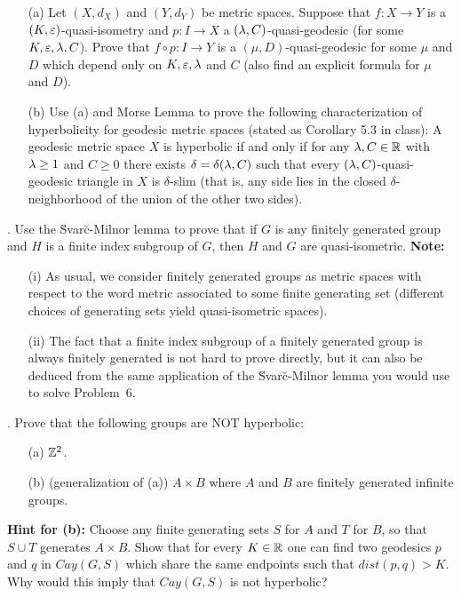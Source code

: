 \documentclass[12pt]{amsart}
\begin{document}
\begin{itemize}
\item[(a)] Let $(X,d_X)$ and $(Y,d_Y)$ be metric spaces. Suppose that $f:X\to Y$ is a $(K,{\varepsilon})$-quasi-isometry and
$p:I\to X$ a $({\lambda},C)$-quasi-geodesic (for some $K,{\varepsilon},{\lambda},C$). Prove that $f\circ p: I\to Y$ is a $(\mu,D)$-quasi-geodesic
for some $\mu$ and $D$ which depend only on $K,{\varepsilon},{\lambda}$ and $C$ (also find an explicit formula for $\mu$ and $D$).
\item[(b)] Use (a) and Morse Lemma to prove the following characterization of hyperbolicity for geodesic metric spaces
(stated as Corollary 5.3 in class):
A geodesic metric space $X$ is hyperbolic if and only if for any ${\lambda},C\in{\mathbb R}$ with ${\lambda}\geq 1$ and $C\geq 0$
there exists $\delta=\delta({\lambda},C)$ such that every $({\lambda},C)$-quasi-geodesic triangle in $X$ is $\delta$-slim
(that is, any side lies in the closed $\delta$-neighborhood of the union of the other two sides).
\end{itemize}
. Use the \u Svar\u c-Milnor lemma to prove that if $G$ is any finitely generated group and $H$ is a finite index subgroup of $G$,
then $H$ and $G$ are quasi-isometric. {\bf Note:} 
\begin{itemize}
\item[(i)] As usual, we consider finitely generated groups as metric spaces with respect to the word metric associated to some finite generating set
(different choices of generating sets yield quasi-isometric spaces).
\item[(ii)] The fact that a finite index subgroup of a finitely generated group is always finitely generated is not hard to prove directly,
but it can also be deduced from the same application of  the \u Svar\u c-Milnor lemma you would use to solve Problem~6.
\end{itemize}
. Prove that the following groups are NOT hyperbolic:
\begin{itemize}
\item[(a)] ${\mathbb Z}^2$.
\item[(b)] (generalization of (a)) $A\times B$ where $A$ and $B$ are finitely generated infinite groups.
\end{itemize}
{\bf Hint for (b):} Choose any finite generating sets $S$ for $A$ and $T$ for $B$, so that $S\cup T$ generates $A\times B$.
Show that for every $K\in{\mathbb R}$ one can find two geodesics $p$ and $q$ in $Cay(G,S)$ which share the same endpoints such that 
$dist(p,q)>K$. Why would this imply that $Cay(G,S)$ is not hyperbolic?
\end{document}
